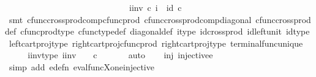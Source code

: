 \begin{isabellebody}
\ \ \ \ \ \ \ \ \ \ \ \ \ \ \ \ \ \ \ \ \ \ \ \ \ \ \ \ \ i{\isacharunderscore}{\kern0pt}inv\ {\isasymcirc}\isactrlsub c\ i\ {\isacharequal}{\kern0pt}\ id{\isacharparenleft}{\kern0pt}{\isasymone}\ {\isasymtimes}\isactrlsub c\ {\isasymone}{\isacharparenright}{\kern0pt}{\isachardoublequoteclose}\isanewline
\ \ \ \ \isamarkupfalse%
\ {\isacharparenleft}{\kern0pt}smt\ cfunc{\isacharunderscore}{\kern0pt}cross{\isacharunderscore}{\kern0pt}prod{\isacharunderscore}{\kern0pt}comp{\isacharunderscore}{\kern0pt}cfunc{\isacharunderscore}{\kern0pt}prod\ cfunc{\isacharunderscore}{\kern0pt}cross{\isacharunderscore}{\kern0pt}prod{\isacharunderscore}{\kern0pt}comp{\isacharunderscore}{\kern0pt}diagonal\ cfunc{\isacharunderscore}{\kern0pt}cross{\isacharunderscore}{\kern0pt}prod{\isacharunderscore}{\kern0pt}def\ cfunc{\isacharunderscore}{\kern0pt}prod{\isacharunderscore}{\kern0pt}type\ cfunc{\isacharunderscore}{\kern0pt}type{\isacharunderscore}{\kern0pt}def\ diagonal{\isacharunderscore}{\kern0pt}def\ i{\isacharunderscore}{\kern0pt}type\ id{\isacharunderscore}{\kern0pt}cross{\isacharunderscore}{\kern0pt}prod\ id{\isacharunderscore}{\kern0pt}left{\isacharunderscore}{\kern0pt}unit\ id{\isacharunderscore}{\kern0pt}type\ left{\isacharunderscore}{\kern0pt}cart{\isacharunderscore}{\kern0pt}proj{\isacharunderscore}{\kern0pt}type\ right{\isacharunderscore}{\kern0pt}cart{\isacharunderscore}{\kern0pt}proj{\isacharunderscore}{\kern0pt}cfunc{\isacharunderscore}{\kern0pt}prod\ right{\isacharunderscore}{\kern0pt}cart{\isacharunderscore}{\kern0pt}proj{\isacharunderscore}{\kern0pt}type\ terminal{\isacharunderscore}{\kern0pt}func{\isacharunderscore}{\kern0pt}unique{\isacharparenright}{\kern0pt}\isanewline
\ \ \isamarkupfalse%
\ \isamarkupfalse%
\ i{\isacharunderscore}{\kern0pt}inv{\isacharunderscore}{\kern0pt}type{\isacharcolon}{\kern0pt}\ {\isachardoublequoteopen}i{\isacharunderscore}{\kern0pt}inv{\isacharcolon}{\kern0pt}\ {\isasymone}{\isasymrightarrow}\ \ {\isasymone}\ {\isasymtimes}\isactrlsub c\ {\isasymone}{\isachardoublequoteclose}\isanewline
\ \ \ \ \isamarkupfalse%
\ auto\isanewline
\isanewline
\ \ \isamarkupfalse%
\ inj{\isacharcolon}{\kern0pt}\ {\isachardoublequoteopen}injective{\isacharparenleft}{\kern0pt}e{\isacharparenright}{\kern0pt}{\isachardoublequoteclose}\isanewline
\ \ \ \ \isamarkupfalse%
\ {\isacharparenleft}{\kern0pt}simp\ add{\isacharcolon}{\kern0pt}\ e{\isacharunderscore}{\kern0pt}defn\ eval{\isacharunderscore}{\kern0pt}func{\isacharunderscore}{\kern0pt}X{\isacharunderscore}{\kern0pt}one{\isacharunderscore}{\kern0pt}injective{\isacharparenright}{\kern0pt}\isanewline

\end{isabellebody}
